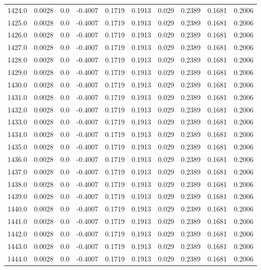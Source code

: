 \begin{longtable}{lrrrrrrrrr}
1424.0 & 0.0028 & 0.0 & -0.4007 & 0.1719 & 0.1913 & 0.029 & 0.2389 & 0.1681 & 0.2006 \\
1425.0 & 0.0028 & 0.0 & -0.4007 & 0.1719 & 0.1913 & 0.029 & 0.2389 & 0.1681 & 0.2006 \\
1426.0 & 0.0028 & 0.0 & -0.4007 & 0.1719 & 0.1913 & 0.029 & 0.2389 & 0.1681 & 0.2006 \\
1427.0 & 0.0028 & 0.0 & -0.4007 & 0.1719 & 0.1913 & 0.029 & 0.2389 & 0.1681 & 0.2006 \\
1428.0 & 0.0028 & 0.0 & -0.4007 & 0.1719 & 0.1913 & 0.029 & 0.2389 & 0.1681 & 0.2006 \\
1429.0 & 0.0028 & 0.0 & -0.4007 & 0.1719 & 0.1913 & 0.029 & 0.2389 & 0.1681 & 0.2006 \\
1430.0 & 0.0028 & 0.0 & -0.4007 & 0.1719 & 0.1913 & 0.029 & 0.2389 & 0.1681 & 0.2006 \\
1431.0 & 0.0028 & 0.0 & -0.4007 & 0.1719 & 0.1913 & 0.029 & 0.2389 & 0.1681 & 0.2006 \\
1432.0 & 0.0028 & 0.0 & -0.4007 & 0.1719 & 0.1913 & 0.029 & 0.2389 & 0.1681 & 0.2006 \\
1433.0 & 0.0028 & 0.0 & -0.4007 & 0.1719 & 0.1913 & 0.029 & 0.2389 & 0.1681 & 0.2006 \\
1434.0 & 0.0028 & 0.0 & -0.4007 & 0.1719 & 0.1913 & 0.029 & 0.2389 & 0.1681 & 0.2006 \\
1435.0 & 0.0028 & 0.0 & -0.4007 & 0.1719 & 0.1913 & 0.029 & 0.2389 & 0.1681 & 0.2006 \\
1436.0 & 0.0028 & 0.0 & -0.4007 & 0.1719 & 0.1913 & 0.029 & 0.2389 & 0.1681 & 0.2006 \\
1437.0 & 0.0028 & 0.0 & -0.4007 & 0.1719 & 0.1913 & 0.029 & 0.2389 & 0.1681 & 0.2006 \\
1438.0 & 0.0028 & 0.0 & -0.4007 & 0.1719 & 0.1913 & 0.029 & 0.2389 & 0.1681 & 0.2006 \\
1439.0 & 0.0028 & 0.0 & -0.4007 & 0.1719 & 0.1913 & 0.029 & 0.2389 & 0.1681 & 0.2006 \\
1440.0 & 0.0028 & 0.0 & -0.4007 & 0.1719 & 0.1913 & 0.029 & 0.2389 & 0.1681 & 0.2006 \\
1441.0 & 0.0028 & 0.0 & -0.4007 & 0.1719 & 0.1913 & 0.029 & 0.2389 & 0.1681 & 0.2006 \\
1442.0 & 0.0028 & 0.0 & -0.4007 & 0.1719 & 0.1913 & 0.029 & 0.2389 & 0.1681 & 0.2006 \\
1443.0 & 0.0028 & 0.0 & -0.4007 & 0.1719 & 0.1913 & 0.029 & 0.2389 & 0.1681 & 0.2006 \\
1444.0 & 0.0028 & 0.0 & -0.4007 & 0.1719 & 0.1913 & 0.029 & 0.2389 & 0.1681 & 0.2006 \\

\end{longtable}

